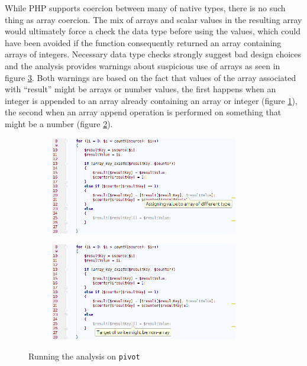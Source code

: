 While PHP supports coercion between many of native types, there is no such thing as array coercion. The mix of arrays and scalar values in the resulting array would ultimately force a check the data type before using the values, which could have been avoided if the function consequently returned an array containing arrays of integers. Necessary data type checks strongly suggest bad design choices and the analysis provides warnings about suspicious use of arrays as seen in figure \ref{fig:pivotScreenshot}. Both warnings are based on the fact that values of the array associated with ``result'' might be arrays or number values, the first happens when an integer is appended to an array already containing an array or integer (figure \ref{fig:pivotScreenshot1}), the second when an array append operation is performed on something that might be a number (figure \ref{fig:pivotScreenshot2}). 

\begin{figure}
\centering
\begin{subfigure}{\textwidth}
\centering
\includegraphics[width=0.9\textwidth]{chapters/caseStudy/screens/pivot1}
\label{fig:pivotScreenshot1}
\end{subfigure}
\begin{subfigure}{\textwidth}
\centering
\includegraphics[width=0.9\textwidth]{chapters/caseStudy/screens/pivot2}
\label{fig:pivotScreenshot2}
\end{subfigure}
\caption{Running the analysis on \texttt{pivot}}
\label{fig:pivotScreenshot}
\end{figure}

